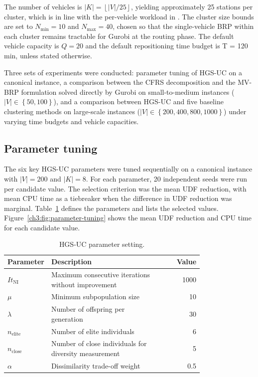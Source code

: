 The number of vehicles is $\left| K \right|=\left\lfloor |V|/25 \right\rfloor $, yielding approximately 25 stations per cluster, which is in line with the per-vehicle workload in \citet{schuijbroekInventoryRebalancingVehicle2017}. The cluster size bounds are set to ${N_{\min}} = 10$ and ${N_{\max}} = 40$, chosen so that the single-vehicle BRP within each cluster remains tractable for Gurobi at the routing phase. The default vehicle capacity is $Q=20$ and the default repositioning time budget is T = 120 min, unless stated otherwise.

Three sets of experiments were conducted: parameter tuning of HGS-UC on a canonical instance, a comparison between the CFRS decomposition and the MV-BRP formulation solved directly by Gurobi on small-to-medium instances ($\mid V\mid \in \left\{ 50,100 \right\}$), and a comparison between HGS-UC and five baseline clustering methods on large-scale instances ($\mid V\mid \in \left\{ 200,400,800,1000 \right\}$) under varying time budgets and vehicle capacities.

\subsection{Parameter tuning}\label{ch3:subsec:parameter-tuning}

The six key HGS-UC parameters were tuned sequentially on a canonical instance with $\mid V\mid =200$ and $\left| K \right|=8$. For each parameter, 20 independent seeds were run per candidate value. The selection criterion was the mean UDF reduction, with mean CPU time as a tiebreaker when the difference in UDF reduction was marginal. Table~\ref{tab:hgsuc-parameters} defines the parameters and lists the selected values. Figure~\ref{ch3:fig:parameter-tuning} shows the mean UDF reduction and CPU time for each candidate value.

\begin{table}[htbp]
\centering
\caption{HGS-UC parameter setting.}
\label{tab:hgsuc-parameters}
\begin{tabular}{p{0.22\linewidth}p{0.56\linewidth}r}
\toprule
Parameter & Description & Value \\
\midrule
$I{{t}_{\text{NI}}}$ & Maximum consecutive iterations without improvement & 1000 \\
$\mu$ & Minimum subpopulation size & 10 \\
$\lambda$ & Number of offspring per generation & 30 \\
${{n}_{\text{elite}}}$ & Number of elite individuals & 6 \\
${{n}_{\text{close}}}$ & Number of close individuals for diversity measurement & 5 \\
$\alpha$ & Dissimilarity trade-off weight & 0.5 \\
\bottomrule
\end{tabular}
\end{table}

